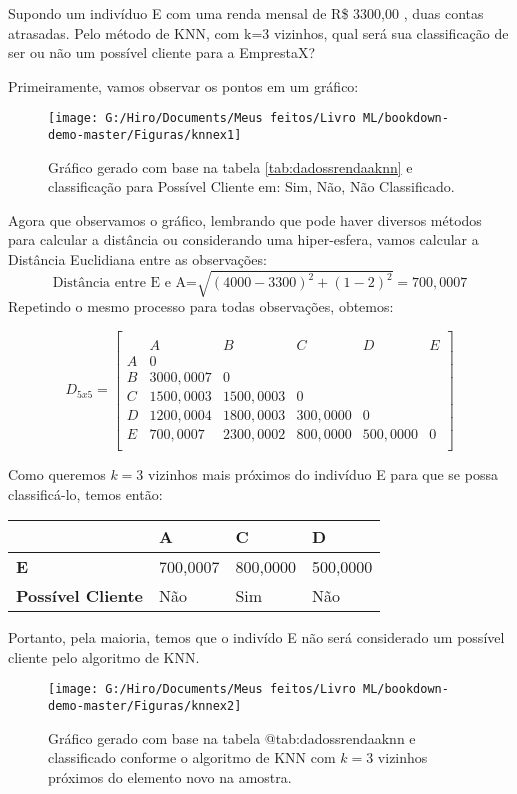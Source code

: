 \documentclass[
  openany]{book}
\begin{document}
Supondo um indivíduo E com uma renda mensal de R\$ 3300,00 , duas contas atrasadas. Pelo método de KNN, com k=3 vizinhos, qual será sua classificação de ser ou não um possível cliente para a EmprestaX?

Primeiramente, vamos observar os pontos em um gráfico:

\begin{figure}

{\centering \texttt{[image: G:/Hiro/Documents/Meus feitos/Livro ML/bookdown-demo-master/Figuras/knnex1]} 

}

\caption{Gráfico gerado com base na tabela \ref{tab:dadossrendaaknn} e classificação para Possível Cliente em: Sim, Não, Não Classificado.}\label{fig:knnex1}
\end{figure}



Agora que observamos o gráfico, lembrando que pode haver diversos métodos para calcular a distância ou considerando uma hiper-esfera, vamos calcular a Distância Euclidiana entre as observações:
\[\mbox{Distância entre E e A=}\sqrt{(4000-3300)^2+(1-2)^2}=700,0007\]
Repetindo o mesmo processo para todas observações, obtemos:

\[D_{5x5}=\begin{bmatrix}\\
 &A&B&C&D&E \\
 A&0&&&&\\
 B&3000,0007&0&&&\\
 C & 1500,0003& 1500,0003&0&&\\
 D& 1200,0004& 1800,0003& 300,0000&0&\\
 E& 700,0007& 2300,0002& 800,0000& 500,0000&0\\
\end{bmatrix}\]

Como queremos \(k=3\) vizinhos mais próximos do indivíduo E para que se possa classificá-lo, temos então:

\begin{longtable}[]{@{}llll@{}}
\toprule
& \textbf{A} & \textbf{C} & \textbf{D}\tabularnewline
\midrule
\endhead
\textbf{E} & 700,0007 & 800,0000 & 500,0000\tabularnewline
\textbf{Possível Cliente} & Não & Sim & Não\tabularnewline
\bottomrule
\end{longtable}

Portanto, pela maioria, temos que o indivído E não será considerado um possível cliente pelo algoritmo de KNN.

\begin{figure}

{\centering \texttt{[image: G:/Hiro/Documents/Meus feitos/Livro ML/bookdown-demo-master/Figuras/knnex2]} 

}

\caption{Gráfico gerado com base na tabela @tab:dadossrendaaknn e classificado conforme o algoritmo de KNN com \(k=3\) vizinhos próximos do elemento novo na amostra.}\label{fig:knnex2}
\end{figure}
\end{document}
